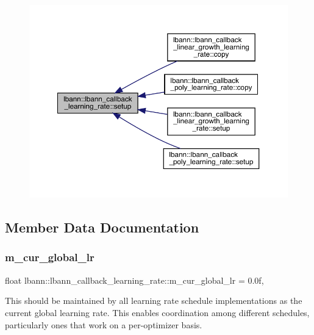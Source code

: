 \begin{figure}[H]
\begin{center}
\leavevmode
\includegraphics[width=350pt]{classlbann_1_1lbann__callback__learning__rate_a501f31a6b8fde1282a60e4b347e8d9d3_icgraph}
\end{center}
\end{figure}


\subsection{Member Data Documentation}
\mbox{\label{classlbann_1_1lbann__callback__learning__rate_a97194f282c29a748c915d9811a8a99fb}} 
\subsubsection{\texorpdfstring{m\+\_\+cur\+\_\+global\+\_\+lr}{m\_cur\_global\_lr}}
{\footnotesize\ttfamily float lbann\+::lbann\+\_\+callback\+\_\+learning\+\_\+rate\+::m\+\_\+cur\+\_\+global\+\_\+lr = 0.\+0f\hspace{0.3cm}{\ttfamily [static]}, {\ttfamily [protected]}}

This should be maintained by all learning rate schedule implementations as the current global learning rate. This enables coordination among different schedules, particularly ones that work on a per-\/optimizer basis. 

